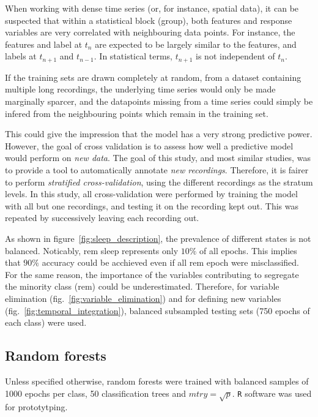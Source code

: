 When working with dense time series (or, for instance, spatial data), it can be suspected that within a statistical block (group),
both features and response variables are very correlated with neighbouring data points.
For instance, the features and label at $t_n$ are expected to be largely similar to the features, and labels at $t_{n+1}$ and $t_{n-1}$.
In statistical terms, $t_{n+1}$ is not independent of $t_{n}$.

If the training sets are drawn completely at random, from a dataset containing multiple long recordings, 
the underlying time series would only be made marginally sparcer, and the datapoints missing from
a time series could simply be infered from the neighbouring points which remain in the training set.

This could give the impression that the model has a very strong predictive power.
However, the goal of cross validation is to assess how well a predictive model would perform on \emph{new data}. 
The goal of this study, and most similar studies, was to provide a tool to automatically annotate \emph{new recordings}. 
Therefore, it is fairer to perform \emph{stratified cross-validation}, using the different recordings as the stratum levels.
In this study, all cross-validation were performed by training the model with all but one recordings,
and testing it on the recording kept out. This was repeated by successively leaving each recording out.

As shown in figure~\ref{fig:sleep_description}, the prevalence of different states is not balanced. Noticably, \gls{rem} sleep represents only $10\%$ of all epochs.
This implies that $90\%$ accuracy could be acchieved even if all \gls{rem} epoch were misclassified.
For the same reason, the importance of the variables contributing to segregate the minority class (\gls{rem}) could be underestimated.
Therefore, for variable elimination (fig.~\ref{fig:variable_elimination}) and for defining new variables (fig.~\ref{fig:temporal_integration}),
balanced subsampled testing sets (750 epochs of each class) were used.

\subsection{Random forests}
Unless specified otherwise, random forests \citationneeded{} were trained with balanced samples of 1000 epochs per class,
50 classification trees and $mtry =\sqrt{p}$.
\texttt{R} software \citationneeded{} was used for prototytping.


